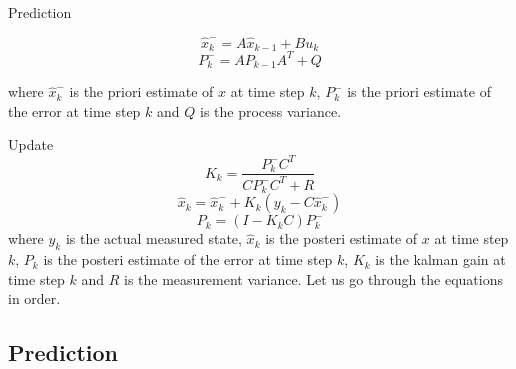 \documentclass[a4paper,12pt]{book}
\begin{document}
Prediction

\begin{equation}
    \hat{x}^-_k=A\hat{x}_{k-1}+Bu_k
\end{equation}
\begin{equation}
    P^-_k=AP_{k-1}A^T+Q
\end{equation}


where $\hat{x}_k^{-}$ is the priori estimate of $x$ at time step $k$, $P^-_k$ is the priori estimate of the error at time step $k$ and $Q$ is the process variance.

Update
\begin{equation}
    K_k=\frac{P^-_kC^T}{CP^-_kC^T+R}
\end{equation}
\begin{equation}
    \hat{x}_k=\hat{x}^-_k+K_k(y_k-C\hat{x}^-_k)
\end{equation}
\begin{equation}
    P_k=(I-K_kC)P^-_k
\end{equation}
where $y_k$ is the actual measured state, $\hat{x}_k$ is the posteri estimate of $x$ at time step $k$, $P_k$ is the posteri estimate of the error at time step $k$, $K_k$ is the kalman gain at time step $k$ and $R$ is the measurement variance. Let us go through the equations in order.


\subsection{Prediction}
\end{document}
